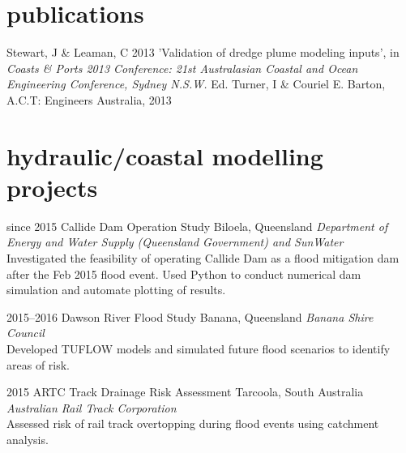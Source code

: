 \documentclass[print]{friggeri}
\begin{document}
\section{publications}
\begin{adjustwidth}{2cm}{}
Stewart, J \& Leaman, C 2013 'Validation of dredge plume modeling inputs', in {\emph{Coasts \& Ports 2013 Conference: 21st Australasian Coastal and Ocean Engineering Conference, Sydney N.S.W.}} Ed. Turner, I \& Couriel E. Barton, A.C.T: Engineers Australia, 2013
\end{adjustwidth}






\newpage

\section{hydraulic/coastal modelling projects}

\begin{entrylist}
\entry%
{since 2015}
{Callide Dam Operation Study}
{Biloela, Queensland}
{\emph{Department of Energy and Water Supply (Queensland Government) and SunWater} \\
Investigated the feasibility of operating Callide Dam as a flood mitigation dam after the Feb 2015 flood event. Used Python to conduct numerical dam simulation and automate plotting of results. }
\end{entrylist}

\begin{entrylist}
\entry%
{2015--2016}
{Dawson River Flood Study}
{Banana, Queensland}
{\emph{Banana Shire Council} \\
Developed TUFLOW models and simulated future flood scenarios to identify areas of risk. }
\end{entrylist}

\begin{entrylist}
\entry%
{2015}
{ARTC Track Drainage Risk Assessment}
{Tarcoola, South Australia}
{\emph{Australian Rail Track Corporation} \\
Assessed risk of rail track overtopping during flood events using catchment analysis.}
\end{entrylist}
\end{document}
